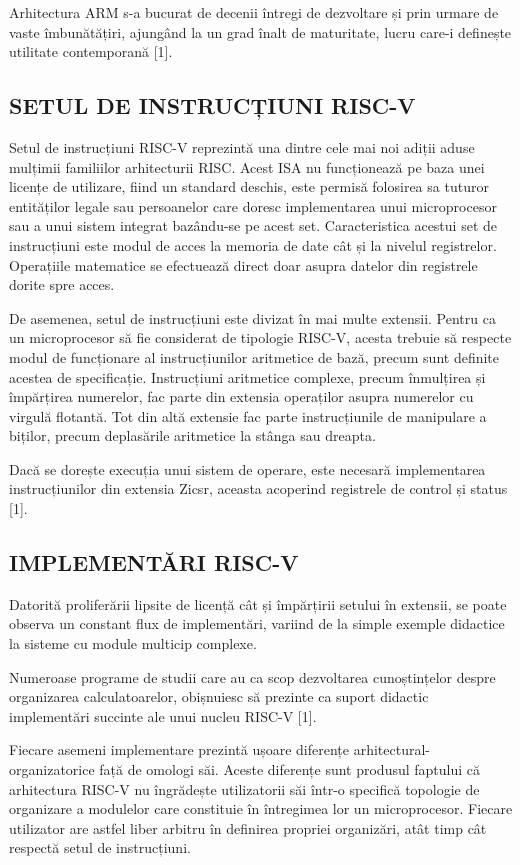 \documentclass[12pt]{article}
\begin{document}
Arhitectura ARM s-a bucurat de decenii întregi de dezvoltare și prin urmare de vaste îmbunătățiri, ajungând la un grad înalt de maturitate, lucru care-i definește utilitate contemporană [1].

\subsection{SETUL DE INSTRUCȚIUNI RISC-V}
Setul de instrucțiuni RISC-V reprezintă una dintre cele mai noi adiții aduse mulțimii familiilor arhitecturii RISC. Acest ISA nu funcționează pe baza unei licențe de utilizare, fiind un standard deschis, este permisă folosirea sa tuturor entităților legale sau persoanelor care doresc implementarea unui microprocesor sau a unui sistem integrat bazându-se pe acest set. Caracteristica acestui set de instrucțiuni este modul de acces la memoria de date cât și la nivelul registrelor. Operațiile matematice se efectuează direct doar asupra datelor din registrele dorite spre acces.

De asemenea, setul de instrucțiuni este divizat în mai multe extensii. Pentru ca un microprocesor să fie considerat de tipologie RISC-V, acesta trebuie să respecte modul de funcționare al instrucțiunilor aritmetice de bază, precum sunt definite acestea de specificație.
Instrucțiuni aritmetice complexe, precum înmulțirea și împărțirea numerelor, fac parte din extensia operaților asupra numerelor cu virgulă flotantă. Tot din altă extensie fac parte instrucțiunile de manipulare a biților, precum deplasările aritmetice la stânga sau dreapta.

Dacă se dorește execuția unui sistem de operare, este necesară implementarea instrucțiunilor din extensia Zicsr, aceasta acoperind registrele de control și status [1].

\subsection{IMPLEMENTĂRI  RISC-V}
Datorită proliferării lipsite de licență cât și împărțirii setului în extensii, se poate observa un constant flux de implementări, variind de la simple exemple didactice la sisteme cu module multicip complexe. 

Numeroase programe de studii care au ca scop dezvoltarea cunoștințelor despre organizarea calculatoarelor, obișnuiesc să prezinte ca suport didactic implementări succinte ale unui nucleu RISC-V [1].

 Fiecare asemeni implementare prezintă ușoare diferențe arhitectural-organizatorice față de omologi săi. Aceste diferențe sunt produsul faptului că arhitectura RISC-V nu îngrădește utilizatorii săi într-o specifică topologie de organizare a modulelor care constituie în întregimea lor un microprocesor. Fiecare utilizator are astfel liber arbitru în definirea propriei organizări, atât timp cât respectă setul de instrucțiuni.
\end{document}
